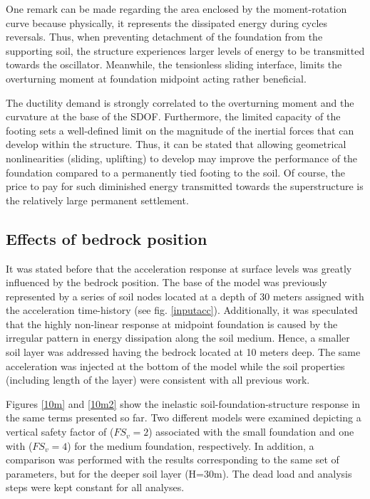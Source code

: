 One remark can be made regarding the area enclosed by the moment-rotation curve because physically, it represents the dissipated energy during cycles reversals. Thus, when preventing detachment of the foundation from the supporting soil, the structure experiences larger levels of energy to be transmitted towards the oscillator. Meanwhile, the tensionless sliding interface, limits the overturning moment at foundation midpoint acting rather beneficial.

The ductility demand is strongly correlated to the overturning moment and the curvature at the base of the SDOF. Furthermore, the limited capacity of the footing sets a well-defined limit on the magnitude of the inertial forces that can develop within the structure. Thus, it can be stated that allowing geometrical nonlinearities (sliding, uplifting) to develop may improve the performance of the foundation compared to a permanently tied footing to the soil. Of course, the price to pay for such diminished energy transmitted towards the superstructure is the relatively large permanent settlement. 

\subsection{Effects of bedrock position}
It was stated before that the acceleration response at surface levels was greatly influenced by the bedrock position. The base of the model was previously represented by a series of soil nodes located at a depth of 30 meters assigned with the acceleration time-history (see fig. \ref{inputacc}). Additionally, it was speculated that the highly non-linear response at midpoint foundation is caused by the irregular pattern in energy dissipation along the soil medium. Hence, a smaller soil layer was addressed having the bedrock located at 10 meters deep. The same acceleration was injected at the bottom of the model while the soil properties (including length of the layer) were consistent with all previous work.

Figures \ref{10m} and \ref{10m2} show the inelastic soil-foundation-structure response in the same terms presented so far. Two different models were examined depicting a vertical safety factor of ($FS_v=2$) associated with the small foundation and one with ($FS_v=4$) for the medium foundation, respectively. In addition, a comparison was performed with the results corresponding to the same set of parameters, but for the deeper soil layer (H=30m). The dead load and analysis steps were kept constant for all analyses.

